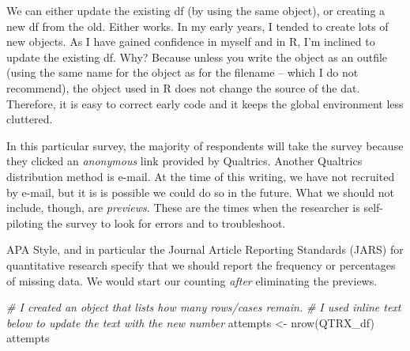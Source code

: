 \documentclass[
]{book}
\newenvironment{Shaded}{\begin{snugshade}}{\end{snugshade}}
\newcommand{\CommentTok}[1]{\textcolor[rgb]{0.56,0.35,0.01}{\textit{#1}}}
\newcommand{\FunctionTok}[1]{\textcolor[rgb]{0.00,0.00,0.00}{#1}}
\newcommand{\NormalTok}[1]{#1}
\newcommand{\OtherTok}[1]{\textcolor[rgb]{0.56,0.35,0.01}{#1}}
\newcommand{\SpecialCharTok}[1]{\textcolor[rgb]{0.00,0.00,0.00}{#1}}
\newcommand{\StringTok}[1]{\textcolor[rgb]{0.31,0.60,0.02}{#1}}
\begin{document}
We can either update the existing df (by using the same object), or creating a new df from the old. Either works. In my early years, I tended to create lots of new objects. As I have gained confidence in myself and in R, I'm inclined to update the existing df. Why? Because unless you write the object as an outfile (using the same name for the object as for the filename -- which I do not recommend), the object used in R does not change the source of the dat. Therefore, it is easy to correct early code and it keeps the global environment less cluttered.

In this particular survey, the majority of respondents will take the survey because they clicked an \emph{anonymous} link provided by Qualtrics. Another Qualtrics distribution method is e-mail. At the time of this writing, we have not recruited by e-mail, but it is is possible we could do so in the future. What we should not include, though, are \emph{previews}. These are the times when the researcher is self-piloting the survey to look for errors and to troubleshoot.

\begin{Shaded}
\end{Shaded}

APA Style, and in particular the Journal Article Reporting Standards (JARS) for quantitative research specify that we should report the frequency or percentages of missing data. We would start our counting \emph{after} eliminating the previews.

\begin{Shaded}
\begin{Highlighting}[]
\CommentTok{\# I created an object that lists how many rows/cases remain.}
\CommentTok{\# I used inline text below to update the text with the new number}
\NormalTok{attempts }\OtherTok{\textless{}{-}} \FunctionTok{nrow}\NormalTok{(QTRX\_df)}
\NormalTok{attempts}
\end{Highlighting}
\end{Shaded}
\end{document}
